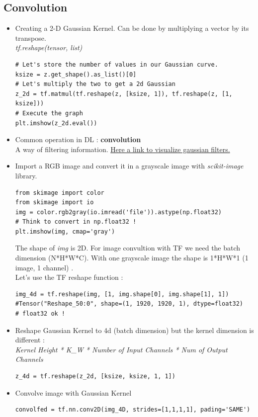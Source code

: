\documentclass[12pt,a4paper]{article}
\begin{document}
\subsection{Convolution}
\begin{itemize}
\item Creating a 2-D Gaussian Kernel. Can be done by multiplying a vector by its transpose.\\
\textit{tf.reshape(tensor, list)}
\begin{lstlisting}
# Let's store the number of values in our Gaussian curve.
ksize = z.get_shape().as_list()[0]
# Let's multiply the two to get a 2d Gaussian
z_2d = tf.matmul(tf.reshape(z, [ksize, 1]), tf.reshape(z, [1, ksize]))
# Execute the graph
plt.imshow(z_2d.eval())
\end{lstlisting}
\item Common operation in DL : \textbf{convolution}\\
A way of filtering information. \href{http://setosa.io/ev/image-kernels/}{Here a link to visualize gaussian filters.}
\item Import a RGB image and convert it in a grayscale image with \textit{scikit-image} library.
\begin{lstlisting}
from skimage import color
from skimage import io
img = color.rgb2gray(io.imread('file')).astype(np.float32)
# Think to convert in np.float32 !
plt.imshow(img, cmap='gray')
\end{lstlisting}
The shape of \textit{img} is 2D. For image convultion with TF we need the batch dimension (N*H*W*C). With one grayscale image the shape is 1*H*W*1 (1 image, 1 channel) .\\
Let's use the TF reshape function :
\begin{lstlisting}
img_4d = tf.reshape(img, [1, img.shape[0], img.shape[1], 1])
#Tensor("Reshape_50:0", shape=(1, 1920, 1920, 1), dtype=float32)
# float32 ok !
\end{lstlisting}
\item Reshape Gaussian Kernel to 4d (batch dimension) but the kernel dimension is different : \\
\textit{Kernel Height * K\_W * Number of Input Channels * Num of Output Channels}
\begin{lstlisting}
z_4d = tf.reshape(z_2d, [ksize, ksize, 1, 1])
\end{lstlisting}
\item Convolve image with Gaussian Kernel
\begin{lstlisting}
convolfed = tf.nn.conv2D(img_4D, strides=[1,1,1,1], pading='SAME')

\end{lstlisting}
\end{itemize}
\end{document}

